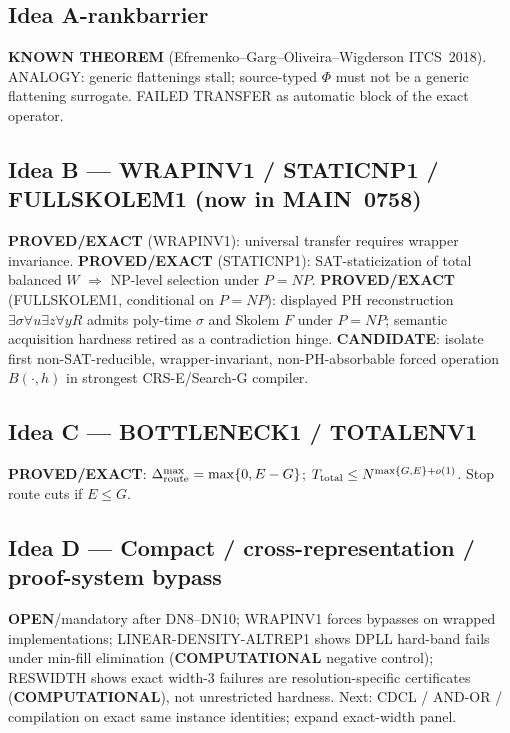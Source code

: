 \documentclass[11pt]{article}
\begin{document}
\subsection*{Idea A-rankbarrier}
\textbf{KNOWN THEOREM} (Efremenko--Garg--Oliveira--Wigderson ITCS~2018). ANALOGY: generic
flattenings stall; source-typed $\Phi$ must not be a generic flattening surrogate.
FAILED TRANSFER as automatic block of the exact operator.

\subsection*{Idea B --- WRAPINV1 / STATICNP1 / FULLSKOLEM1 (now in MAIN~0758)}
\textbf{PROVED/EXACT} (WRAPINV1): universal transfer requires wrapper invariance.
\textbf{PROVED/EXACT} (STATICNP1): SAT-staticization of total balanced $W$ $\Rightarrow$ NP-level
selection under $P=NP$.
\textbf{PROVED/EXACT} (FULLSKOLEM1, conditional on $P=NP$): displayed PH reconstruction
$\exists\sigma\forall u\exists z\forall y R$ admits poly-time $\sigma$ and Skolem $F$ under $P=NP$;
semantic acquisition hardness retired as a contradiction hinge.
\textbf{CANDIDATE}: isolate first non-SAT-reducible, wrapper-invariant, non-PH-absorbable
forced operation $B(\cdot,h)$ in strongest CRS-E/Search-G compiler.

\subsection*{Idea C --- BOTTLENECK1 / TOTALENV1}
\textbf{PROVED/EXACT}: $\Delta_{\rm route}^{\max}=\max\{0,E-G\}$;
$T_{\rm total}\le N^{\max\{G,E\}+o(1)}$. Stop route cuts if $E\le G$.

\subsection*{Idea D --- Compact / cross-representation / proof-system bypass}
\textbf{OPEN}/mandatory after DN8--DN10; WRAPINV1 forces bypasses on wrapped implementations;
LINEAR-DENSITY-ALTREP1 shows DPLL hard-band fails under min-fill elimination
(\textbf{COMPUTATIONAL} negative control); RESWIDTH shows exact width-$3$ failures are
resolution-specific certificates (\textbf{COMPUTATIONAL}), not unrestricted hardness.
Next: CDCL / AND-OR / compilation on exact same instance identities; expand exact-width panel.
\end{document}
